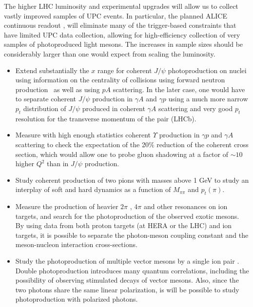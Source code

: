 \documentclass[../report.tex]{subfiles}
\begin{document}
The higher LHC luminosity and experimental upgrades will allow us to collect vastly improved samples of UPC events.   In particular, the planned ALICE continuous readout \cite{Krivda:2017sto}, will eliminate many of the trigger-based constraints that have limited UPC data collection, allowing for high-efficiency collection of very samples of photoproduced light mesons.   The increases in sample sizes should be considerably larger than one would expect from scaling the luminosity.  
\begin{itemize}
\item
Extend substantially the $x$ range for coherent $J/\psi$ photoproduction on nuclei
using information on the centrality of collisions using forward neutron production~\cite{Guzey:2013jaa}
 as well as using $pA$ scattering. In the later case, one would have to separate coherent $J/\psi$ production in $\gamma A$ and $\gamma p$  using a much more narrow $p_t$ distribution of $J/\psi $ produced in coherent $\gamma A$ scattering
 and very good $p_t$ resolution for the transverse momentum of the pair (LHCb).
\item
Measure with high enough  statistics coherent $\Upsilon $ production in $\gamma p$ and $\gamma A$
scattering to check the expectation of the 20\% reduction of the coherent cross section, which would allow one to probe gluon shadowing at a factor of $\sim 10 $ higher $Q^2$ than in $J/\psi$ production.
\item
Study coherent production of two pions with masses above 1 GeV to study an interplay of soft and hard dynamics as a function of $M_{\pi \pi}$ and $p_t(\pi)$.   
\item
Measure the production of heavier $2\pi$ \cite{Klein:2016dtn}, $4\pi$ and other resonances on ion targets, and search for the photoproduction of the observed exotic mesons.  
By using data from both proton targets (at HERA or the LHC) and ion targets, it is possible to separate the photon-meson coupling constant and the meson-nucleon interaction cross-sections.  
\item
Study the photoproduction of multiple vector mesons by a single ion pair \cite{Klein:1999qj}.   Double photoproduction introduces many quantum correlations, including the possibility of observing stimulated decays of vector mesons.  Also, since the two photons share the same linear polarization, is will be possible to study photoproduction with polarized photons.

\end{itemize}
\end{document}
